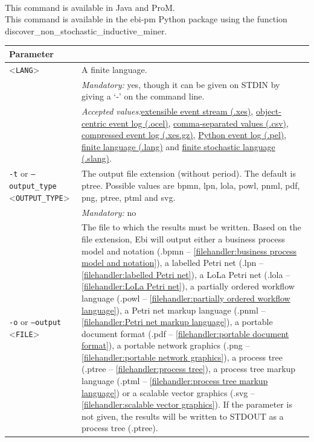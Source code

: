 {\\This command is available in Java and ProM.
\\This command is available in the ebi-pm Python package using the function discover\_non\_stochastic\_inductive\_miner.
\begin{tabularx}{\linewidth}{lX}
\toprule
Parameter \\\midrule
<\texttt{LANG}>&A finite language.\\
&\textit{Mandatory:} \quad yes, though it can be given on STDIN by giving a `-' on the command line.\\
&\textit{Accepted values:}\quad \hyperref[filehandler:extensible event stream]{extensible event stream (.xes)}, \hyperref[filehandler:object-centric event log]{object-centric event log (.ocel)}, \hyperref[filehandler:comma-separated values]{comma-separated values (.csv)}, \hyperref[filehandler:compressed event log]{compressed event log (.xes.gz)}, \hyperref[filehandler:Python event log]{Python event log (.pel)}, \hyperref[filehandler:finite language]{finite language (.lang)} and \hyperref[filehandler:finite stochastic language]{finite stochastic language (.slang)}.\\
\texttt{-t} or \texttt{--output\_type} <\texttt{OUTPUT\_TYPE}> &
The output file extension (without period). The default is ptree. Possible values are bpmn, lpn, lola, powl, pnml, pdf, png, ptree, ptml and svg.\\
&\textit{Mandatory:} \quad no\\
\texttt{-o} or \texttt{--output} <\texttt{FILE}> &
The file to which the results must be written. Based on the file extension, Ebi will output either a business process model and notation (.bpmn -- \cref{filehandler:business process model and notation}), a labelled Petri net (.lpn -- \cref{filehandler:labelled Petri net}), a LoLa Petri net (.lola -- \cref{filehandler:LoLa Petri net}), a partially ordered workflow language (.powl -- \cref{filehandler:partially ordered workflow language}), a Petri net markup language (.pnml -- \cref{filehandler:Petri net markup language}), a portable document format (.pdf -- \cref{filehandler:portable document format}), a portable network graphics (.png -- \cref{filehandler:portable network graphics}), a process tree (.ptree -- \cref{filehandler:process tree}), a process tree markup language (.ptml -- \cref{filehandler:process tree markup language}) or a scalable vector graphics (.svg -- \cref{filehandler:scalable vector graphics}).
If the parameter is not given, the results will be written to STDOUT as a process tree (.ptree).\\

\end{tabularx}}
